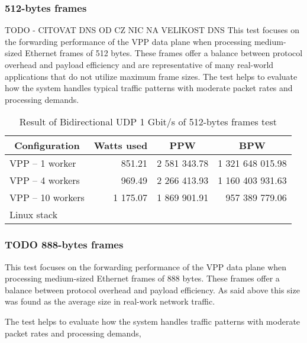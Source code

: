 \subsubsection{512-bytes frames}
TODO - CITOVAT DNS OD CZ NIC NA VELIKOST DNS
This test focuses on the forwarding performance of the VPP data plane when processing medium-sized Ethernet frames of 512 bytes. 
These frames offer a balance between protocol overhead and payload efficiency and are representative of many real-world applications that do not utilize maximum frame sizes. 
The test helps to evaluate how the system handles typical traffic patterns with moderate packet rates and processing demands.

\begin{table}[h!]
\centering
\begin{tabular}{|l|r|r|r|}
\hline
\multicolumn{1}{|c|}{\textbf{Configuration}} &
\multicolumn{1}{c|}{\textbf{Watts used}} &
\multicolumn{1}{c|}{\textbf{PPW}} &
\multicolumn{1}{c|}{\textbf{BPW}} \\
\hline
VPP -- 1 worker & 851.21 & 2 581 343.78 & 1 321 648 015.98 \\
VPP -- 4 workers & 969.49 & 2 266 413.93 & 1 160 403 931.63 \\
VPP -- 10 workers & 1 175.07 & 1 869 901.91 & 957 389 779.06 \\
Linux stack &  &  &  \\
\hline
\end{tabular}
\caption{Result of Bidirectional UDP 1 Gbit/s of 512-bytes frames test}
\label{tab:udp:one}
\end{table}

\subsubsection{TODO 888-bytes frames}

This test focuses on the forwarding performance of the VPP data plane when processing medium-sized Ethernet frames of 888 bytes. 
These frames offer a balance between protocol overhead and payload efficiency. As said above this size was found as the average size in real-work network traffic.

The test helps to evaluate how the system handles traffic patterns with moderate packet rates and processing demands, 

